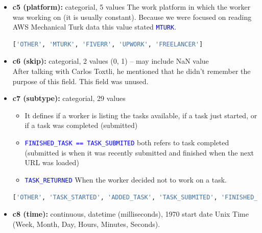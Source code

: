 \documentclass[11pt]{article}
\newcommand{\codeword}[1]{\texttt{\textcolor{blue}{#1}}}
\begin{document}
\begin{itemize}
\begin{itemize}
        \item \textbf{project.monetary\_reward.amount\_in\_dollars:} US dollar award amount after the project has been completed by the worker.
    \end{itemize}
    \item \textbf{c5 (platform):} categorial, 5 values
    The work platform in which the worker was working on (it is usually constant). Because we were focused on reading AWS Mechanical Turk data this value stated \codeword{MTURK}.
    \begin{lstlisting}[language=Python, caption=Chrome Plugin: 'platform' value.]
['OTHER', 'MTURK', 'FIVERR', 'UPWORK', 'FREELANCER']
\end{lstlisting}
    \item \textbf{c6 (skip):} categorial, 2 values (0, 1) – may include NaN value \\
    After talking with Carlos Toxtli, he mentioned that he didn't remember the purpose of this field. This field was unused.
    \item \textbf{c7 (subtype):} categorial, 29 values
    \begin{itemize}
        \item It defines if a worker is listing the tasks available, if a task just started, or if a task was completed (submitted)
        \item \codeword{FINISHED\_TASK == TASK\_SUBMITED} both refers to task completed (submitted is when it was recently submitted and finished when the next URL was loaded)
        \item \codeword{TASK\_RETURNED} When the worker decided not to work on a task.
    \end{itemize}
    \begin{lstlisting}[language=Python, caption=Chrome Plugin: 'subtype' value.]
['OTHER', 'TASK_STARTED', 'ADDED_TASK', 'TASK_SUBMITED', 'FINISHED_TASK', 'TASKS_LIST', 'WORKER_DASHBOARD', 'UNKNOWN', 'TASK_FRAME', 'TASK_PREVIEW', 'TASK_INFO', 'TASK_RETURNED', 'PLATFORM_LOGIN', 'TASK_QUEUE', 'TASK_SKIP', 'WORKER_EARNINGS_DETAILS', 'TASK_TIMEOUT', 'WORKER_EARNINGS', 'WORKER_QUALIFICATIONS', 'TASKS_PER_REQUESTER', 'MESSAGES_SEND', 'TASKS_LIST_FILTER', 'WORKER_QUALIFICATIONS_PENDING', 'TASKS_PREVIEW', 'PLATFORM_HELP', 'TASKS_PROJECTS', 'TASKS_DETAILS', 'MESSAGES_READ', 'TASKS_APPLY']
\end{lstlisting}
    \item \textbf{c8 (time):} continuous, datetime (milliseconds), 1970 start date Unix Time (Week, Month, Day, Hours, Minutes, Seconds).\\ \\

\end{itemize}
\end{document}
